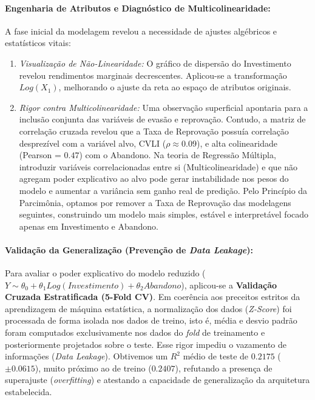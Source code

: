 \documentclass[10pt]{article}
\begin{document}
\paragraph{Engenharia de Atributos e Diagnóstico de Multicolinearidade:}
A fase inicial da modelagem revelou a necessidade de ajustes algébricos e estatísticos vitais:
\begin{enumerate}
    \item \textit{Visualização de Não-Linearidade:} O gráfico de dispersão do Investimento revelou rendimentos marginais decrescentes. Aplicou-se a transformação $Log(X_1)$, melhorando o ajuste da reta ao espaço de atributos originais.
    \item \textit{Rigor contra Multicolinearidade:} Uma observação superficial apontaria para a inclusão conjunta das variáveis de evasão e reprovação. Contudo, a matriz de correlação cruzada revelou que a Taxa de Reprovação possuía correlação desprezível com a variável alvo, CVLI ($\rho \approx 0.09$), e alta colinearidade (Pearson = $0.47$) com o Abandono. Na teoria de Regressão Múltipla, introduzir variáveis correlacionadas entre si (Multicolinearidade) e que não agregam poder explicativo ao alvo pode gerar instabilidade nos pesos do modelo e aumentar a variância sem ganho real de predição. Pelo Princípio da Parcimônia, optamos por remover a Taxa de Reprovação das modelagens seguintes, construindo um modelo mais simples, estável e interpretável focado apenas em Investimento e Abandono.
\end{enumerate}

\paragraph{Validação da Generalização (Prevenção de \textit{Data Leakage}):}
Para avaliar o poder explicativo do modelo reduzido ($Y \sim \theta_0 + \theta_1 Log(Investimento) + \theta_2 Abandono$), aplicou-se a \textbf{Validação Cruzada Estratificada (5-Fold CV)}. Em coerência aos preceitos estritos da aprendizagem de máquina estatística, a normalização dos dados (\textit{Z-Score}) foi processada de forma isolada nos dados de treino, isto é, média e desvio padrão foram computados exclusivamente nos dados do \textit{fold} de treinamento e posteriormente projetados sobre o teste. Esse rigor impediu o vazamento de informações (\textit{Data Leakage}). Obtivemos um $R^2$ médio de teste de $0.2175$ ($\pm 0.0615$), muito próximo ao de treino ($0.2407$), refutando a presença de superajuste (\textit{overfitting}) e atestando a capacidade de generalização da arquitetura estabelecida.
\end{document}

